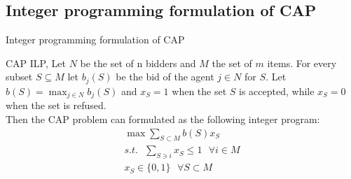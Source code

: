 \documentclass[aspectratio=169,xcolor=dvipsnames]{beamer}
\begin{document}
    \subsection{Integer programming formulation of CAP}
    \begin{frame}{Integer programming formulation of CAP}
        \begin{block}{CAP ILP, \cite{cap_survey}}
        Let $N$ be the set of n bidders and $M$ the set of $m$ items. For every subset $S \subseteq M$ let $b_j(S)$ be the bid of the agent $j \in N$ for $S$. Let $b(S)= \max_{j \in N}b_j(S)$ and $x_S = 1$ when the set $S$ is accepted, while $x_S = 0$ when the  set is refused.\\
        Then the CAP problem can formulated as the following integer program:
        \begin{gather*}
            \max \sum _{S\subset M} b(S)x_S \\
            s.t. \hspace{8pt} \sum _{S \ni i} x_S \leq 1 \hspace{8pt} \forall i \in M \\ 
            x_S \in \{0,1\} \hspace{8pt} \forall S\subset M
        \end{gather*}
        \end{block}
    \end{frame}
\end{document}
